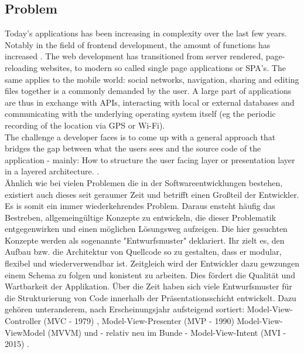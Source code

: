 \subsection{Problem}
\label{subsec:problem}



Today's applications has been increasing in complexity over the last few years. Notably in the field of frontend development, the amount of functions has increased 
\cite{kevin2018}. 
The web development has transitioned from server rendered, 
page-reloading websites, to modern so called single page applications or SPA's.
The same applies to the mobile world: social networks, navigation, sharing and editing files together is a commonly demanded by the user.
A large part of applications are thus in exchange with APIs, interacting with local or external databases
and communicating with the underlying operating system itself (eg the periodic recording of the location via GPS or Wi-Fi).
\\
The challenge a developer faces is to come up with a general approach that bridges the gap between what the users sees and the source code of 
the application - mainly: How to structure the user facing layer or presentation layer in a layered architecture. 
\cite{guru99ntier,softwareArchitecturePatternsMark2015}. 
\\
Ähnlich wie bei vielen Problemen die in der Softwareentwicklungen bestehen, existiert auch dieses seit geraumer Zeit und betrifft einen Großteil der Entwickler.
Es is somit ein immer wiederkehrendes Problem. Daraus ensteht häufig das Bestreben, allgemeingültige Konzepte zu entwickeln, die dieser Problematik entgegenwirken 
und einen möglichen Lösungsweg aufzeigen. Die hier gesuchten Konzepte werden als sogenannte "Entwurfsmuster" 
\cite{techterms2016design-pattern} 
deklariert. Ihr zielt es, den Aufbau bzw. die Architektur von Quellcode so zu gestalten, dass er modular, flexibel und
wiederverwendbar ist. Zeitgleich wird der Entwickler dazu gewzungen einem Schema zu folgen und konistent zu arbeiten. Dies fördert die Qualität und
Wartbarkeit der Applikation. Über die Zeit haben sich viele Entwurfsmuster für die Strukturierung von Code innerhalb der Präsentationsschicht entwickelt. 
Dazu gehören unteranderem, nach Erscheinungsjahr aufsteigend sortiert: Model-View-Controller (MVC - 1979) 
\cite{wikipediaMvc}, 
Model-View-Presenter (MVP - 1990) 
\cite{wikipediaMvp} 
Model-View-ViewModel (MVVM) 
\cite{blogMsdnMvvm} und - relativ 
neu im Bunde - Model-View-Intent (MVI - 2015) 
\cite{youtubeAndreStaltzUserFunction}. 
